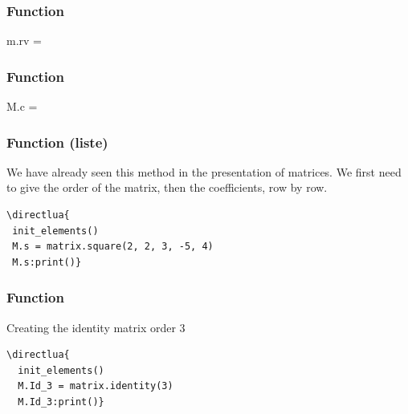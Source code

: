 \subsubsection{Function }
\label{ssub:function_row_vector}

\begin{mybox}

m.rv = 
\end{mybox}

\subsubsection{Function }
\label{ssub:function_matrix_create_n_m}

\begin{mybox}

M.c = 
\end{mybox}

\subsubsection{Function (liste)}
\label{ssub:method_square}

We have already seen this method in the presentation of matrices. We first need to give the order of the matrix, then the coefficients, row by row.

\begin{minipage}{.5\textwidth}
\begin{verbatim}
\directlua{
 init_elements()
 M.s = matrix.square(2, 2, 3, -5, 4)
 M.s:print()}
\end{verbatim}
\end{minipage}
\begin{minipage}{.5\textwidth}
\end{minipage}

\subsubsection{Function }
\label{ssub:method_identity}

Creating the identity matrix order 3


\begin{minipage}{.5\textwidth}
\begin{verbatim}
\directlua{
  init_elements()
  M.Id_3 = matrix.identity(3)
  M.Id_3:print()}
\end{verbatim}
\end{minipage}
\begin{minipage}{.5\textwidth}
\end{minipage}

